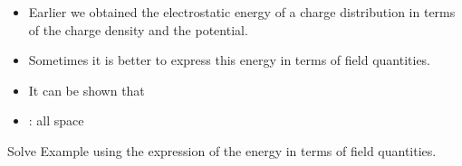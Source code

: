 \begin{ELjoin}

\begin{itemize}
\tightlist
\item
  Earlier we obtained the electrostatic energy of a charge distribution in terms of the charge density and the potential.
\item
  Sometimes it is better to express this energy in terms of field quantities.
\item
  It can be shown that
\end{itemize}

\begin{ELimportant}{}


\end{ELimportant}

\end{ELjoin}

\begin{ELjoin}

\begin{itemize}
\tightlist
\item
  : all space
\end{itemize}


\begin{ELexample}{}

Solve Example  using the expression of the energy in terms of field quantities.

\begin{ELsolution}


\end{ELsolution}

\end{ELexample}

\end{ELjoin}

